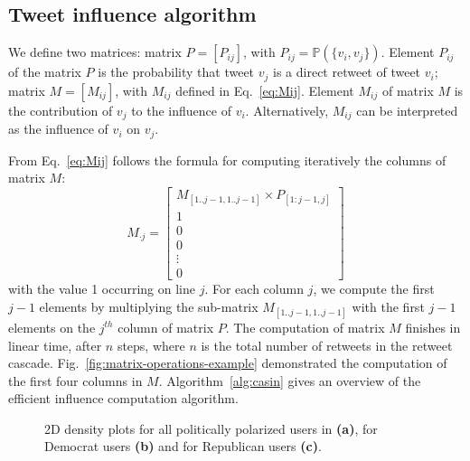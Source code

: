 \subsection{Tweet influence algorithm}

We define two matrices:
matrix $P = [ P_{ij} ]$, with $P_{ij} = \mathds{P}(\{v_i, v_j\})$.
Element $P_{ij}$ of the matrix $P$ is the probability that tweet $v_j$ is a direct retweet of tweet $v_i$;
matrix $M = [ M_{ij} ]$, with $M_{ij}$ defined in Eq.~\eqref{eq:Mij}.
Element $M_{ij}$ of matrix $M$ is the contribution of $v_j$ to the influence of $v_i$.
Alternatively, $M_{ij}$ can be interpreted as the influence of $v_i$ on $v_j$.

From Eq.~\eqref{eq:Mij} follows the formula for computing iteratively the columns of matrix $M$:
\begin{equation} \label{eq:Mij-matrix}
M_{ \cdot j}=
\left[
\begin{array}{c}
M_{[1..j-1, 1..j-1]} \times P_{[1:j-1,j]} \\
1 \\
0 \\
0 \\
\vdots \\
0 
\end{array}
\right]
\end{equation}
with the value 1 occurring on line $j$.
For each column $j$, we compute the first $j-1$ elements by multiplying the sub-matrix $M_{[1..j-1, 1..j-1]}$ with the first $j-1$ elements on the $j^{th}$ column of matrix $P$.
The computation of matrix $M$ finishes in linear time, after $n$ steps, where $n$ is the total number of retweets in the retweet cascade.
Fig.~\ref{fig:matrix-operations-example} demonstrated the computation of the first four columns in $M$.
Algorithm~\ref{alg:casin} gives an overview of the efficient influence computation algorithm.

\begin{figure*}[tbp]
	\centering
	\newcommand\mywidth{0.3}
	\caption{
		2D density plots for all politically polarized users in \debate \textbf{(a)}, for Democrat users \textbf{(b)} and for Republican users \textbf{(c)}.
	}
	\label{si-fig:additional-2d}
\end{figure*}

